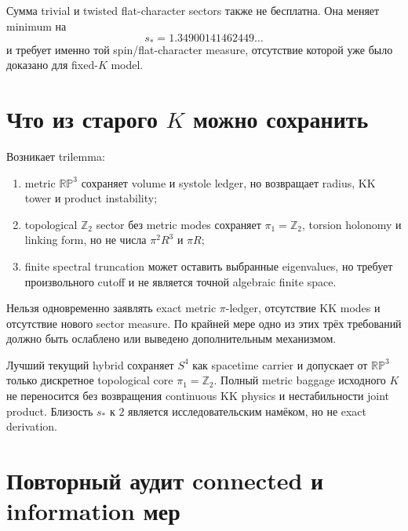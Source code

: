 Сумма trivial и twisted flat-character sectors также не бесплатна. Она
меняет minimum на
\begin{equation}
 s_*=1.34900141462449\ldots
\end{equation}
и требует именно той spin/flat-character measure, отсутствие которой уже
было доказано для fixed-\(K\) model.

\section{Что из старого \texorpdfstring{\(K\)}{K} можно сохранить}

Возникает trilemma:
\begin{enumerate}
 \item metric \(\mathbb{RP}^3\) сохраняет volume и systole ledger, но
 возвращает radius, KK tower и product instability;
 \item topological \(\mathbb Z_2\) sector без metric modes сохраняет
 \(\pi_1=\mathbb Z_2\), torsion holonomy и linking form, но не числа
 \(\pi^2R^3\) и \(\pi R\);
 \item finite spectral truncation может оставить выбранные eigenvalues, но
 требует произвольного cutoff и не является точной algebraic finite space.
\end{enumerate}

\begin{nogocriterion}
Нельзя одновременно заявлять exact metric \(\pi\)-ledger, отсутствие KK
modes и отсутствие нового sector measure. По крайней мере одно из этих трёх
требований должно быть ослаблено или выведено дополнительным механизмом.
\end{nogocriterion}

\begin{theorem}
Лучший текущий hybrid сохраняет \(S^4\) как spacetime carrier и допускает от
\(\mathbb{RP}^3\) только дискретное topological core
\(\pi_1=\mathbb Z_2\). Полный metric baggage исходного \(K\) не переносится
без возвращения continuous KK physics и нестабильности joint product.
Близость \(s_*\) к \(2\) является исследовательским намёком, но не exact
derivation.
\end{theorem}

\section{Повторный аудит connected и information мер}

